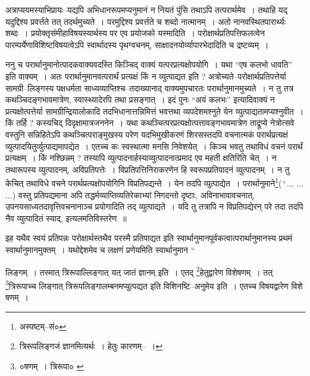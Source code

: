 \documentclass[article,12pt,a4paper]{memoir}
\newcommand{\add}[1]{($^{+}$#1)}
\begin{document}
	  \pstart अत्राप्ययमस्याभिप्रायः--यद्यपि अभिधानरूपमप्यनुमानं न नियतं पुंसि तथाऽपि तत्परार्थमेव । तथाहि यद् यदुद्दिश्य प्रवर्त्तते तत् तदर्थमुच्यते । परमुद्दिश्य प्रवर्त्तते च शब्दो नात्मानम् । अतो नानवस्थितपारार्थ्यः शब्दः । प्रयोक्तृसंमीहाविषयस्यार्थस्य पर एव प्रयोजको यस्मादिति । परोक्षार्थप्रतिपत्तिफलत्वेन पारम्पर्येणाविशिष्टविषयत्वेऽपि स्वार्थादस्य पृथग्वचनम्, साक्षादनयोर्व्यापारभेदादिति च द्रष्टव्यम् ।
	\pend
      

	  \pstart ननु च परार्थानुमानोत्पादकवाक्यवदस्ति किञ्चिद् वाक्यं यत्परप्रत्यक्षोपयोगि । यथा “एष कलभो धावति” इति वाक्यम् । अतः परार्थानुमानवत्परार्थं प्रत्यक्षं किं न व्युत्पाद्यत इति ? अत्रोच्यते--परोक्षार्थप्रतिपत्तेर्या सामग्री--लिङ्गस्य पक्षधर्मता साध्यव्याप्तिश्च--तदाख्यानाद् वाक्यमुपचारतः परार्थानुमानमुच्यते । न तु तत्र कथञ्चिदङ्गभावमात्रेण, स्वास्थ्यादेरपि तथा प्रसङ्गात् । इदं पुनः “अयं कलभः” इत्यादिवाक्यं न प्रत्यक्षोत्पत्तेर्या सामग्रीन्द्रियालोकादि तदभिधानात्तन्निमित्तं भवत्तथा व्यपदेशमश्नुते येन व्युत्पाद्यतामप्यश्नुवीत । किं तर्हि ? कस्यचिद् दिदृक्षामात्रजननेन । यथा कथञ्चित्परप्रत्यक्षोत्पत्तावङ्गभावमात्रेण ताद्रूप्ये नेत्रोत्सवे वस्तुनि सन्निहितेऽपि कथञ्चित्पराङ्मुखस्य परेण यदभिमुखीकरणं \leavevmode{} शिरसस्तदपि वचनात्मकं परार्थप्रत्यक्षं व्युत्पादयितुर्व्युत्पाद्यमापद्येत । एतच्च कः स्वस्थात्मा मनसि निवेशयेत् । किञ्च भवतु तथाविधं वचनं परार्थं प्रत्यक्षम् । किं नश्छिन्नम् ? तस्यापि व्युत्पादनार्हस्याव्युत्पादनात्प्रमाद एव महती क्षतिरिति चेत् । न तथारूपस्य व्युत्पादनम्, अविप्रतिपत्तेः । विप्रतिपत्तिनिराकरणेन हि स्वरूपप्रतिपादनं व्युत्पादनम् । न तु केचित् तथाविधे वचने परार्थप्रत्यक्षोपयोगिनि विप्रतिपद्यन्ते । येन तदपि व्युत्पाद्येत । परार्थानुमाने\footnote{अस्पष्टम्--सं०}\add{... ... ...} वस्तु प्रतिपद्यमाना अपि तद्धर्मव्याप्तिव्यतिरेकाभ्यां निगदन्तो दृष्टाः, अविनाभावावचनात्, उपनयसाध्यतदावृत्तिवचनानाञ्च प्रयोगादिति तद् व्युत्पाद्यते । यदि तु तत्रापि न विप्रतिपद्येरन् परे तदा तदपि नैव व्युत्पादितं स्याद्, इत्यलमतिविस्तरेण ॥
	\pend
      

	  \pstart इह यथैव स्वयं प्रतिपन्नः परोक्षार्थस्तथैव परस्मै प्रतिपाद्यत इति स्वार्थानुमानपूर्वकत्वात्परार्थानुमानस्य प्रथमं स्वार्थानुमानमुक्तम् । यथोद्देशमेव च लक्षणं प्रणेयमिति स्वार्थानुमान  \leavevmode{} “
	  
	लिङ्गम् । तस्मात् त्रिरूपाल्लिङ्गात् यत् जातं ज्ञानम् इति । एतद् \footnote{त्रिरूपलिङ्गजं ज्ञानमित्यर्थः । हेतुः कारणम्--\cite{dp-msD-n} ।}\-हेतुद्वारेण विशेषणम् । तत् \footnote{०षणम् । त्रिरूपा० \cite{dp-msC} \cite{dp-msD}}\-त्रिरूपाच्च लिङ्गात् त्रिरूपलिङ्गालम्बनमप्युत्पद्यत इति विशिनष्टि--अनुमेय इति । एतच्च विषयद्वारेण विशे षणम् । 
	  
\end{document}

